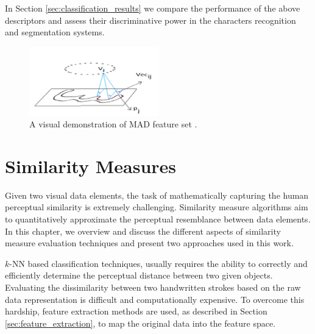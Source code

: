 In Section \ref{sec:classification_results} we compare the performance of the above descriptors and assess their discriminative power in the characters recognition and segmentation systems. 

\begin{figure}
\centering
\includegraphics[width=0.5\textwidth]{./figures/mad_demo}       
\caption{A visual demonstration of MAD feature set \cite{saabni2013multi}.}
\label{fig:mad_demo}
\end{figure}

\newpage{}

\section{Similarity Measures}
\label{sec:similarity_measures}

\iftoggle{edit-mode}{\hspace{0pt}\marginpar{Introduction}}{}
Given two visual data elements, the task of mathematically capturing the human perceptual similarity is extremely challenging. Similarity measure algorithms aim to quantitatively approximate the perceptual resemblance between data elements. In this chapter, we overview and discuss the different aspects of similarity measure evaluation techniques and present two approaches used in this work.

\iftoggle{edit-mode}{\hspace{0pt}\marginpar{Intuition}}{}
$k$-NN based classification techniques, usually requires the ability to correctly and efficiently determine the perceptual distance between two given objects.
Evaluating the dissimilarity between two handwritten strokes based on the raw data representation is difficult and computationally expensive. 
To overcome this hardship, feature extraction methods are used, as described in Section \ref{sec:feature_extraction}, to map the original data into the feature space.  

